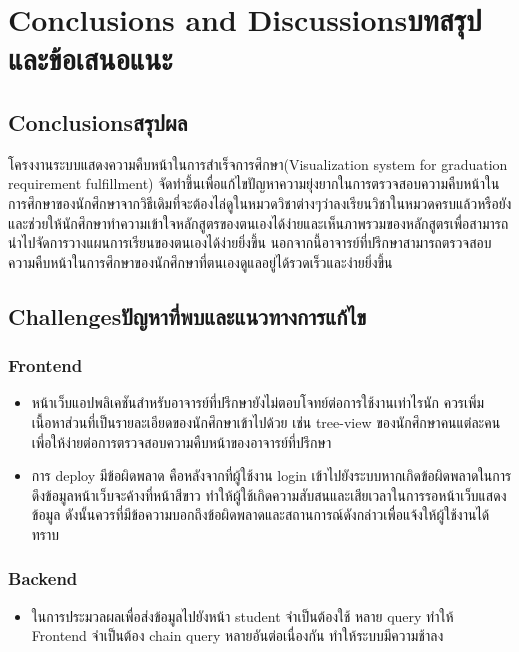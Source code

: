 \chapter{\ifenglish Conclusions and Discussions\else บทสรุปและข้อเสนอแนะ\fi}

\section{\ifenglish Conclusions\else สรุปผล\fi}

โครงงานระบบแสดงความคืบหน้าในการสำเร็จการศึกษา(Visualization system for graduation requirement fulfillment) 
จัดทำขึ้นเพื่อแก้ไขปัญหาความยุ่งยากในการตรวจสอบความคืบหน้าในการศึกษาของนักศึกษาจากวิธีเดิมที่จะต้องไล่ดูในหมวดวิชาต่างๆว่าลงเรียนวิชาในหมวดครบแล้วหรือยัง 
และช่วยให้นักศึกษาทำความเข้าใจหลักสูตรของตนเองได้ง่ายและเห็นภาพรวมของหลักสูตรเพื่อสามารถนำไปจัดการวางแผนการเรียนของตนเองได้ง่ายยิ่งขึ้น 
นอกจากนี้อาจารย์ที่ปรึกษาสามารถตรวจสอบความคืบหน้าในการศึกษาของนักศึกษาที่ตนเองดูแลอยู่ได้รวดเร็วและง่ายยิ่งขึ้น

\section{\ifenglish Challenges\else ปัญหาที่พบและแนวทางการแก้ไข\fi}

\subsection{Frontend}
\begin{itemize}
    \item  หน้าเว็บแอปพลิเคชันสำหรับอาจารย์ที่ปรึกษายังไม่ตอบโจทย์ต่อการใช้งานเท่าไรนัก 
    ควรเพิ่มเนื้อหาส่วนที่เป็นรายละเอียดของนักศึกษาเข้าไปด้วย เช่น tree-view 
    ของนักศึกษาคนแต่ละคนเพี่อให้ง่ายต่อการตรวจสอบความคืบหน้าของอาจารย์ที่ปรึกษา
    \item การ deploy มีข้อผิดพลาด คือหลังจากที่ผู้ใช้งาน login เข้าไปยังระบบหากเกิดข้อผิดพลาดในการดึงข้อมูลหน้าเว็บจะค้างที่หน้าสีขาว 
    ทำให้ผู้ใช้เกิดความสับสนและเสียเวลาในการรอหน้าเว็บแสดงข้อมูล ดังนั้นควรที่มีข้อความบอกถึงข้อผิดพลาดและสถานการณ์ดังกล่าวเพื่อแจ้งให้ผู้ใช้งานได้ทราบ
	
\end{itemize}

\subsection{Backend}
\begin{itemize}
    \item ในการประมวลผลเพื่อส่งข้อมูลไปยังหน้า student จําเป็นต้องใช้ หลาย query ทําให้ Frontend จําเป็นต้อง chain query หลายอันต่อเนื่องกัน ทําให้ระบบมีความช้าลง
	
\end{itemize}

